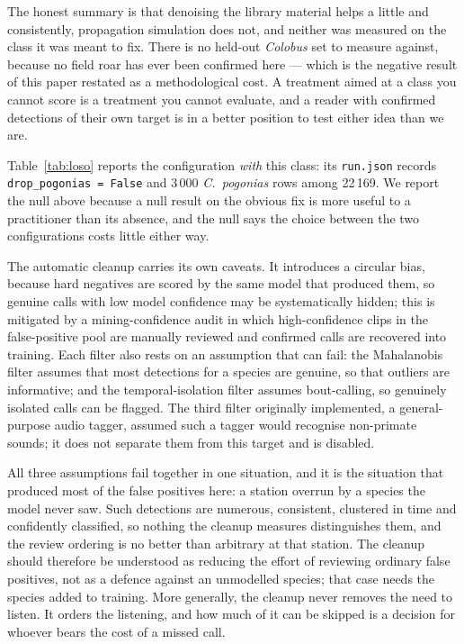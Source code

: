 \documentclass[review,3p,times]{elsarticle}
\begin{document}
The honest summary is that denoising the library material helps a little and
consistently, propagation simulation does not, and neither was measured on the
class it was meant to fix. There is no held-out \textit{Colobus} set to measure
against, because no field roar has ever been confirmed here --- which is the
negative result of this paper restated as a methodological cost. A treatment
aimed at a class you cannot score is a treatment you cannot evaluate, and a
reader with confirmed detections of their own target is in a better position to
test either idea than we are.

Table~\ref{tab:loso} reports the configuration \emph{with} this class: its
\texttt{run.json} records \texttt{drop\_pogonias = False} and 3\,000
\textit{C.\ pogonias} rows among 22\,169. We report the null above because a
null result on the obvious fix is more useful to a practitioner than its
absence, and the null says the choice between the two configurations costs
little either way.

The automatic cleanup carries its own caveats. It introduces a circular bias,
because hard negatives are scored by the same model that produced them, so
genuine calls with low model confidence may be systematically hidden; this is
mitigated by a mining-confidence audit in which high-confidence clips in the
false-positive pool are manually reviewed and confirmed calls are recovered
into training. Each filter also rests on an assumption that can fail: the
Mahalanobis filter assumes that most detections for a species are genuine, so
that outliers are informative; and the temporal-isolation filter assumes
bout-calling, so genuinely isolated calls can be flagged. The third filter
originally implemented, a general-purpose audio tagger, assumed such a tagger
would recognise non-primate sounds; it does not separate them from this target
and is disabled.

All three assumptions fail together in one situation, and it is the situation
that produced most of the false positives here: a station overrun by a species
the model never saw. Such detections are numerous, consistent, clustered in
time and confidently classified, so nothing the cleanup measures distinguishes
them, and the review ordering is no better than arbitrary at that station. The
cleanup should therefore be understood as reducing the effort of reviewing
ordinary false positives, not as a defence against an unmodelled species; that
case needs the species added to training. More generally, the cleanup never
removes the need to listen. It orders the listening, and how much of it can be
skipped is a decision for whoever bears the cost of a missed call.
\end{document}
